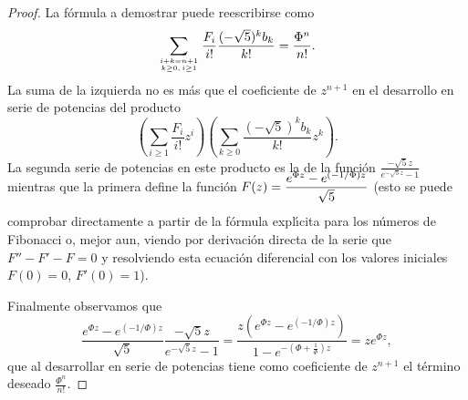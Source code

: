 \begin{proof}
La f\'ormula a demostrar puede reescribirse como
$$\sum_{i+k=n+1\atop k\geq 0,\, i\geq 1}\frac{F_i}{i!}\frac{(-\sqrt 5)^kb_k}{k!}=\frac{\Phi^n}{n!}.$$
La suma de la izquierda no es m\'as que el coeficiente de $z^{n+1}$ en el desarrollo en serie de potencias del producto
$$\left(\sum_{i\geq 1}\frac{F_i}{i!}z^i\right)\left(\sum_{k\geq 0}\frac{(-\sqrt 5)^kb_k}{k!} z^k\right).$$
La segunda serie de potencias en este producto es la de la funci\'on $\displaystyle\frac{-\sqrt 5 z}{e^{-\sqrt 5 z}-1}$ mientras que  la primera define la funci\'on $\rule[-16pt]{0pt}{26pt}\displaystyle \smash{F(z)=\frac{e^{\Phi z}-e^{(-1/\Phi)z}}{\sqrt 5}}$ (esto se puede comprobar directamente a partir de la f\'ormula expl\'\i cita para los n\'umeros de Fibonacci o, mejor aun, viendo por derivaci\'on directa de la serie que $F''-F'-F=0$ y resolviendo esta ecuaci\'on diferencial con los valores iniciales $F(0)=0$, $F'(0)=1$).

Finalmente observamos que
$$ \frac{e^{\Phi z}-e^{(-1/\Phi)z}}{\sqrt 5} \frac{-\sqrt 5 z}{e^{-\sqrt 5 z}-1} =
\frac{z(e^{\Phi z}-e^{(-1/\Phi)z})}{1-e^{-(\Phi+\frac{1}{\Phi})z}}=ze^{\Phi z},$$
que al desarrollar en serie de potencias tiene como coeficiente de $z^{n+1}$ el t\'ermino deseado $\frac{\Phi^n}{n!}$.
\end{proof} 